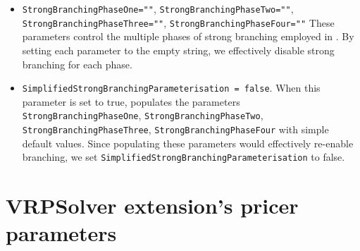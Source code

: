 \begin{itemize}
	\item \texttt{StrongBranchingPhaseOne=""}, \texttt{StrongBranchingPhaseTwo=""}, \texttt{StrongBranchingPhaseThree=""}, \texttt{StrongBranchingPhaseFour=""}
	      These parameters control the multiple phases of strong branching employed in \bapcod.
	      By setting each parameter to the empty string, we effectively disable strong branching for each phase.
	\item \texttt{SimplifiedStrongBranchingParameterisation = false}.
	      When this parameter is set to true, \bapcod populates the parameters \texttt{StrongBranchingPhaseOne}, \texttt{StrongBranchingPhaseTwo}, \texttt{StrongBranchingPhaseThree}, \texttt{StrongBranchingPhaseFour}
	      with simple default values.
	      Since populating these parameters would effectively re-enable branching, we set \texttt{SimplifiedStrongBranchingParameterisation} to false.
\end{itemize}

\section{VRPSolver extension's pricer parameters}

